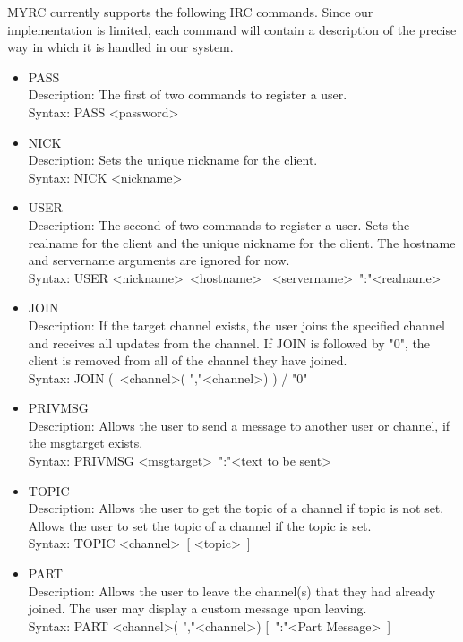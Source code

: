 \documentclass{article}
\begin{document}
MYRC currently supports the following IRC commands. Since our implementation is
limited, each command will contain a description of the precise way in which it
is handled in our system.
\begin{itemize}
    \item PASS\\
    Description: The first of two commands to register a user.\\
    Syntax: PASS \textless password\textgreater

    \item NICK\\
    Description: Sets the unique nickname for the client.\\
    Syntax: NICK \textless nickname\textgreater

    \item USER\\
    Description: The second of two commands to register a user. Sets the realname for
    the client and the unique nickname for the client. The hostname and servername
    arguments are ignored for now.\\
    Syntax: USER \textless nickname\textgreater \ \textless hostname\textgreater
                \ \textless servername\textgreater \ ":"\textless realname\textgreater

    \item JOIN\\
    Description: If the target channel exists, the user joins the specified channel
    and receives all updates from the channel. If JOIN is followed by "0", the client
    is removed from all of the channel they have joined.\\
    Syntax: JOIN (\ \textless channel\textgreater *( ","\textless channel\textgreater ) ) / "0"

    \item PRIVMSG\\
    Description: Allows the user to send a message to another user or channel,
    if the msgtarget exists.\\
    Syntax: PRIVMSG \textless msgtarget\textgreater \ ":"\textless text to be sent\textgreater

    \item TOPIC\\
    Description: Allows the user to get the topic of a channel if topic is not set.
    Allows the user to set the topic of a channel if the topic is set.\\
    Syntax: TOPIC \textless channel\textgreater \ [ \textless topic\textgreater \ ]

    \item PART\\
    Description: Allows the user to leave the channel(s) that they had already joined.
    The user may display a custom message upon leaving.\\
    Syntax: PART \textless channel\textgreater *( ","\textless channel\textgreater )
            [\ ":"\textless Part Message\textgreater \ ]
\end{itemize}
\end{document}
